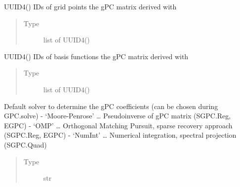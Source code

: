 \documentclass[letterpaper,10pt,english,openany,oneside]{sphinxmanual}
\begin{document}
\begin{fulllineitems}
\begin{fulllineitems}
\label{\detokenize{pygpc:pygpc.GPC.GPC.gpc_matrix_coords_id}}
UUID4() IDs of grid points the gPC matrix derived with
\begin{quote}\begin{description}
\item[{Type}] \leavevmode
list of UUID4()

\end{description}\end{quote}

\end{fulllineitems}


\begin{fulllineitems}
\label{\detokenize{pygpc:pygpc.GPC.GPC.gpc_matrix_b_id}}
UUID4() IDs of basis functions the gPC matrix derived with
\begin{quote}\begin{description}
\item[{Type}] \leavevmode
list of UUID4()

\end{description}\end{quote}

\end{fulllineitems}


\begin{fulllineitems}
\label{\detokenize{pygpc:pygpc.GPC.GPC.solver}}
Default solver to determine the gPC coefficients (can be chosen during GPC.solve)
- ‘Moore-Penrose’ … Pseudoinverse of gPC matrix (SGPC.Reg, EGPC)
- ‘OMP’ … Orthogonal Matching Pursuit, sparse recovery approach (SGPC.Reg, EGPC)
- ‘NumInt’ … Numerical integration, spectral projection (SGPC.Quad)
\begin{quote}\begin{description}
\item[{Type}] \leavevmode
str

\end{description}\end{quote}

\end{fulllineitems}


\end{fulllineitems}
\end{document}
